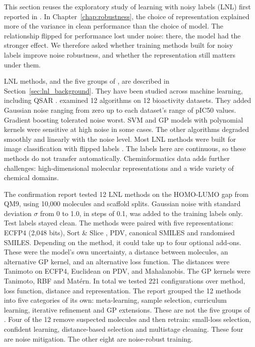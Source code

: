 This section reuses the exploratory study of learning with noisy labels (LNL) first reported in \citet{Punt2026confirmation}. In Chapter~\ref{chap:robustness}, the choice of representation explained more of the variance in clean performance than the choice of model. The relationship flipped for performance lost under noise: there, the model had the stronger effect. We therefore asked whether training methods built for noisy labels improve noise robustness, and whether the representation still matters under them.

LNL methods, and the five groups of \citet{Song2022}, are described in Section~\ref{sec:lnl_background}. They have been studied across machine learning, including QSAR \citep{Cortes2015}. \citet{Cortes2015} examined 12 algorithms on 12 bioactivity datasets. They added Gaussian noise ranging from zero up to each dataset's range of pIC50 values. Gradient boosting tolerated noise worst. SVM and GP models with polynomial kernels were sensitive at high noise in some cases. The other algorithms degraded smoothly and linearly with the noise level. Most LNL methods were built for image classification with flipped labels \citep{Song2022}. The labels here are continuous, so these methods do not transfer automatically. Cheminformatics data adds further challenges: high-dimensional molecular representations and a wide variety of chemical domains.

The confirmation report tested 12 LNL methods on the HOMO-LUMO gap from QM9, using 10,000 molecules and scaffold splits. Gaussian noise with standard deviation $\sigma$ from 0 to 1.0, in steps of 0.1, was added to the training labels only. Test labels stayed clean. The methods were paired with five representations: ECFP4 (2,048 bits), Sort \& Slice \citep{Dablander2024}, PDV, canonical SMILES and randomised SMILES. Depending on the method, it could take up to four optional add-ons. These were the model's own uncertainty, a distance between molecules, an alternative GP kernel, and an alternative loss function. The distances were Tanimoto on ECFP4, Euclidean on PDV, and Mahalanobis. The GP kernels were Tanimoto, RBF and Mat\'{e}rn. In total we tested 221 configurations over method, loss function, distance and representation. The report grouped the 12 methods into five categories of its own: meta-learning, sample selection, curriculum learning, iterative refinement and GP extensions. These are not the five groups of \citet{Song2022}. Four of the 12 remove suspected molecules and then retrain: small-loss selection, confident learning, distance-based selection and multistage cleaning. These four are noise mitigation. The other eight are noise-robust training.

